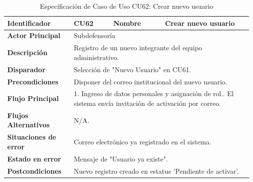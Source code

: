 \begingroup
\setlength{\parskip}{0pt}
\begin{longtable}{|p{3.5cm}|p{2cm}|p{2.5cm}|p{7cm}|}
\caption{Especificación de Caso de Uso CU62: Crear nuevo usuario}
\label{tab:cu62} \\
\hline
\textbf{Identificador} & CU62 & \textbf{Nombre} & Crear nuevo usuario \\ \hline
\textbf{Actor Principal} & \multicolumn{3}{p{11.5cm}|}{Subdefensoría} \\ \hline
\textbf{Descripción} & \multicolumn{3}{p{11.5cm}|}{Registro de un nuevo integrante del equipo administrativo.} \\ \hline
\textbf{Disparador} & \multicolumn{3}{p{11.5cm}|}{Selección de "Nuevo Usuario" en CU61.} \\ \hline
\textbf{Precondiciones} & \multicolumn{3}{p{11.5cm}|}{Disponer del correo institucional del nuevo usuario.} \\ \hline
\textbf{Flujo Principal} & \multicolumn{3}{p{11.5cm}|}{1. Ingreso de datos personales y asignación de rol.\newline 2. El sistema envía invitación de activación por correo.} \\ \hline
\textbf{Flujos Alternativos} & \multicolumn{3}{p{11.5cm}|}{N/A.} \\ \hline
\textbf{Situaciones de error} & \multicolumn{3}{p{11.5cm}|}{Correo electrónico ya registrado en el sistema.} \\ \hline
\textbf{Estado en error} & \multicolumn{3}{p{11.5cm}|}{Mensaje de "Usuario ya existe".} \\ \hline
\textbf{Postcondiciones} & \multicolumn{3}{p{11.5cm}|}{Nuevo registro creado en estatus 'Pendiente de activar'.} \\ \hline
\end{longtable}
\endgroup

\vspace{0.8cm}

